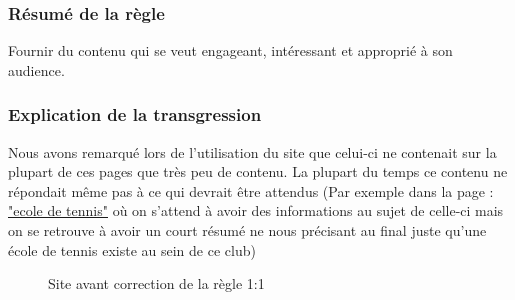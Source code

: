 \documentclass{article}[12pt]
\begin{document}
    \subsubsection*{Résumé de la règle}
    Fournir du contenu qui se veut engageant, intéressant et approprié à son audience.
    \subsubsection*{Explication de la transgression}
    Nous avons remarqué lors de l'utilisation du site que celui-ci ne contenait sur la plupart de ces pages que très peu de contenu. La plupart du temps ce contenu ne répondait même pas à ce qui devrait être attendus (Par exemple dans la page : \href{http://www.tennisclubdeparis.fr/l-ecole-de-tennis.html}{"ecole de tennis"} où on s'attend à avoir des informations au sujet de celle-ci mais on se retrouve à avoir un court résumé ne nous précisant au final juste qu'une école de tennis existe au sein de ce club)
    \begin{figure}[H]
    	\centering
        \caption{Site avant correction de la règle 1:1}
    \end{figure}
    \newpage
\end{document}

